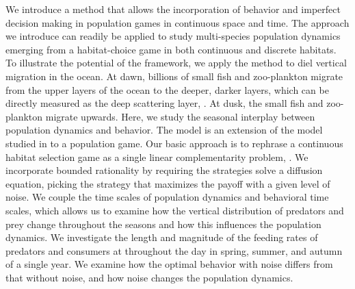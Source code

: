 We introduce a method that allows the incorporation of behavior and imperfect decision making in population games in continuous space and time. The approach we introduce can readily be applied to study multi-species population dynamics emerging from a habitat-choice game in both continuous and discrete habitats. To illustrate the potential of the framework, we apply the method to diel vertical migration in the ocean. At dawn, billions of small fish and zoo-plankton migrate from the upper layers of the ocean to the deeper, darker layers, which can be directly measured as the deep scattering layer, \citep{sutton2013vertical, wang2014seasonal}. At dusk, the small fish and zoo-plankton migrate upwards. Here, we study the seasonal interplay between population dynamics and behavior. The model is an extension of the model studied in \citep{verticalmigration} to a population game. Our basic approach is to rephrase a continuous habitat selection game as a single linear complementarity problem, \citep{miller1991copositive}. We incorporate bounded rationality by requiring the strategies solve a diffusion equation, picking the strategy that maximizes the payoff with a given level of noise.
We couple the time scales of population dynamics and behavioral time scales, which allows us to examine how the vertical distribution of predators and prey change throughout the seasons and how this influences the population dynamics. We investigate the length and magnitude of the feeding rates of predators and consumers at throughout the day in spring, summer, and autumn of a single year. We examine how the optimal behavior with noise differs from that without noise, and how noise changes the population dynamics.

